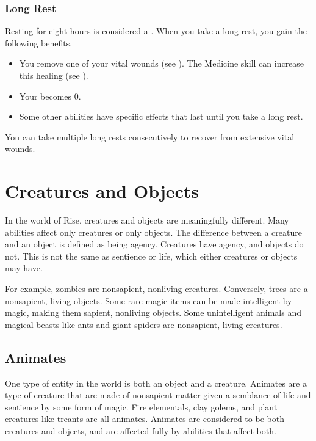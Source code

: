         \subsubsection{Long Rest}\label{Long Rest}
            Resting for eight hours is considered a .
            When you take a long rest, you gain the following benefits.
            \begin{itemize}
                \item You remove one of your vital wounds (see ).
                    The Medicine skill can increase this healing (see ).
                \item Your  becomes 0.
                \item Some other abilities have specific effects that last until you take a long rest.
            \end{itemize}

            You can take multiple long rests consecutively to recover from extensive vital wounds.

\section{Creatures and Objects}
    In the world of Rise, creatures and objects are meaningfully different.
    Many abilities affect only creatures or only objects.
    The difference between a creature and an object is defined as being agency.
    Creatures have agency, and objects do not.
    This is not the same as sentience or life, which either creatures or objects may have.

    For example, zombies are nonsapient, nonliving creatures.
    Conversely, trees are a nonsapient, living objects.
    Some rare magic items can be made intelligent by magic, making them sapient, nonliving objects.
    Some unintelligent animals and magical beasts like ants and giant spiders are nonsapient, living creatures.

    \subsection{Animates}
        One type of entity in the world is both an object and a creature.
        Animates are a type of creature that are made of nonsapient matter given a semblance of life and sentience by some form of magic.
        Fire elementals, clay golems, and plant creatures like treants are all animates.
        Animates are considered to be both creatures and objects, and are affected fully by abilities that affect both.
